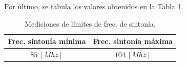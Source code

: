       Por último, se tabula los valores obtenidos en la Tabla \ref{tab:MedFrecSinto}.

        \begin{table}[H]
          \small
          \centering
          \begin{tabular}{c c}
              \toprule
              \textbf{Frec. sintonía mínima} &  \textbf{Frec. sintonía máxima} \\ 
              \midrule
              \(85~[Mhz]\)   &   \(104~[Mhz]\) \\ 
              \bottomrule
          \end{tabular}
          \caption{Mediciones de límites de frec. de sintonía.}
          \label{tab:MedFrecSinto}
        \end{table}

        